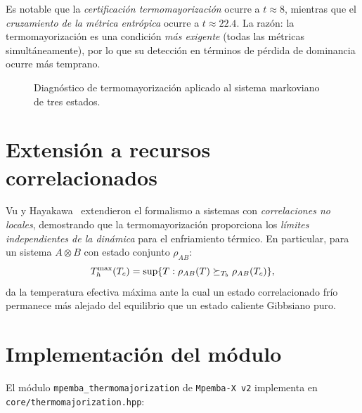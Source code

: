 \noindent Es notable que la \emph{certificación termomayorización} ocurre a 
$t \approx 8$, mientras que el \emph{cruzamiento de la métrica entrópica} 
ocurre a $t \approx 22.4$. La razón: la termomayorización es una condición 
\emph{más exigente} (todas las métricas simultáneamente), por lo que su 
detección en términos de pérdida de dominancia ocurre más temprano.

\begin{figure}[h]
\centering
{}
\caption{Diagnóstico de termomayorización aplicado al sistema markoviano de 
tres estados.}
\label{fig:thermo_diagnostic}
\end{figure}

\section{Extensión a recursos correlacionados}

Vu y Hayakawa~\cite{vuhayakawa2025_resources} extendieron el formalismo a 
sistemas con \emph{correlaciones no locales}, demostrando que la 
termomayorización proporciona los \emph{límites independientes de la dinámica} 
para el enfriamiento térmico. En particular, para un sistema $A \otimes B$ con 
estado conjunto $\rho_{AB}$:
\begin{equation}
    T_{h}^{\max}(T_{c}) = \sup \{ T : \rho_{AB}(T) \succeq_{T_{b}} \rho_{AB}(T_{c}) \},
\end{equation}
%
da la temperatura efectiva máxima ante la cual un estado correlacionado frío 
permanece más alejado del equilibrio que un estado caliente Gibbsiano puro.

\section{Implementación del módulo}

El módulo \texttt{mpemba\_thermomajorization} de \texttt{Mpemba-X v2} implementa 
en \texttt{core/thermomajorization.hpp}:

